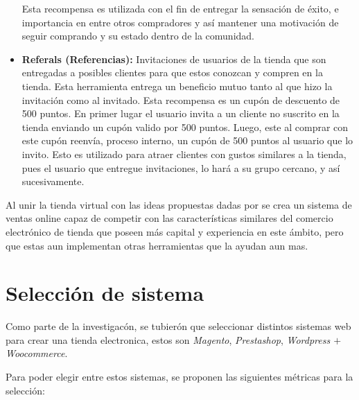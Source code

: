\begin{itemize}
        Esta recompensa es utilizada con el fin de entregar la sensación de éxito,
        e importancia en entre otros compradores y así mantener una motivación
        de seguir comprando y su estado dentro de la comunidad. 

    \item {\bf Referals (Referencias):}
        Invitaciones de usuarios de la tienda que son entregadas a posibles
        clientes para que estos conozcan y compren en la tienda.
        Esta herramienta entrega un beneficio mutuo tanto al que hizo la invitación
        como al invitado. Esta recompensa es un cupón de descuento de 500 puntos.
        En primer lugar el usuario invita a un cliente no suscrito en la tienda
        enviando un cupón valido por 500 puntos.
        Luego, este al comprar con este cupón reenvía,
        proceso interno, un cupón de 500 puntos al usuario que lo invito.
        Esto es utilizado para atraer clientes con gustos similares
        a la tienda, pues el usuario que entregue invitaciones, lo hará a su
        grupo cercano, y así sucesivamente.

\end{itemize}

Al unir la tienda virtual con las ideas propuestas dadas por {\GAM} se crea un
sistema de ventas online capaz de competir con las características similares del
comercio electrónico de tienda que poseen más capital y experiencia en este ámbito,
pero que estas aun implementan otras herramientas que la ayudan aun mas.

\section{Selección de sistema}

Como parte de la investigacón, se tubierón que seleccionar distintos sistemas web para
crear una tienda electronica, estos son \emph{Magento}, \emph{Prestashop}, \emph{Wordpress
$+$ Woocommerce}.

Para poder elegir entre estos sistemas, se proponen las siguientes métricas para
la selección:

